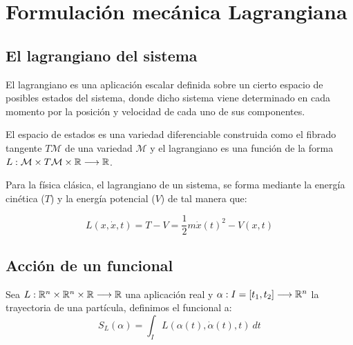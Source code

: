 \chapter{Formulación mecánica Lagrangiana}


\section{El lagrangiano del sistema}

El lagrangiano es una aplicación escalar definida sobre un cierto espacio de posibles estados del sistema, donde dicho sistema viene determinado en cada momento por la posición y velocidad de cada uno de sus componentes.

El espacio de estados es una variedad diferenciable construida como el fibrado tangente $T\mathcal{M}$ de una variedad $\mathcal{M}$ y el lagrangiano es una función de la forma $L:\mathcal{M}\times T\mathcal{M}\times\mathbb{R}\longrightarrow \mathbb{R}$.

Para la física clásica, el lagrangiano de un sistema, se forma mediante la energía cinética ($T$) y la energía potencial ($V$) de tal manera que:
\begin{postulate}
    \begin{equation}
        \label{eq:lagrangiano_clasico}
        L(x,\dot{x},t)=T-V=\frac{1}{2}m\dot{x}(t)^2-V(x,t)
    \end{equation}
\end{postulate}


\section{Acción de un funcional}
\begin{definition}
    Sea $L:\mathbb{R}^n\times\mathbb{R}^n\times\mathbb{R}\longrightarrow \mathbb{R}$ una aplicación real y $\alpha:I=[t_1, t_2]\longrightarrow \mathbb{R}^n$ la trayectoria de una partícula, definimos el funcional  a:
    \begin{equation}
        \label{eq:accion}
        S_L(\alpha)=\int_{I}L(\alpha(t), \dot{\alpha}(t), t)\ dt
    \end{equation}
\end{definition}

